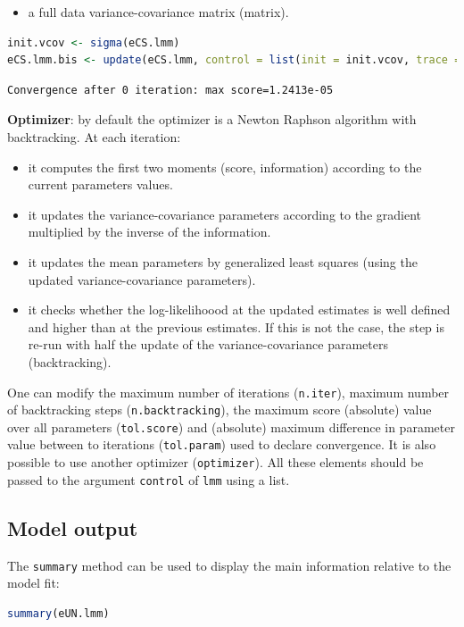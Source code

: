 \documentclass[12pt]{article}
\begin{document}
\begin{itemize}
\item a full data variance-covariance matrix (matrix).
\end{itemize}
\begin{lstlisting}[language=r,numbers=none]
init.vcov <- sigma(eCS.lmm)
eCS.lmm.bis <- update(eCS.lmm, control = list(init = init.vcov, trace = 1))
\end{lstlisting}

\label{}
\begin{verbatim}
Convergence after 0 iteration: max score=1.2413e-05
\end{verbatim}


\textbf{Optimizer}: by default the optimizer is a Newton Raphson algorithm
with backtracking. At each iteration:
\begin{itemize}
\item it computes the first two moments (score, information) according to
the current parameters values.
\item it updates the variance-covariance parameters according to the
gradient multiplied by the inverse of the information.
\item it updates the mean parameters by generalized least squares (using
the updated variance-covariance parameters).
\item it checks whether the log-likelihoood at the updated estimates is
well defined and higher than at the previous estimates. If this is
not the case, the step is re-run with half the update of the
variance-covariance parameters (backtracking).
\end{itemize}

One can modify the maximum number of iterations (\texttt{n.iter}), maximum
number of backtracking steps (\texttt{n.backtracking}), the maximum score
(absolute) value over all parameters (\texttt{tol.score}) and (absolute)
maximum difference in parameter value between to iterations
(\texttt{tol.param}) used to declare convergence. It is also possible to use
another optimizer (\texttt{optimizer}). All these elements should be passed
to the argument \texttt{control} of \texttt{lmm} using a list.

\clearpage
\subsection{Model output}
\label{sec:orgce8f125}

The \texttt{summary} method can be used to display the main information
relative to the model fit:
\begin{lstlisting}[language=r,numbers=none]
summary(eUN.lmm)
\end{lstlisting}
\end{document}
